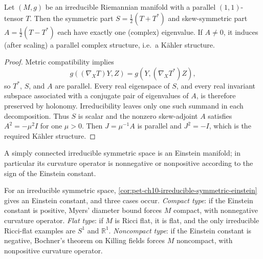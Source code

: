 \begin{theorem}
  \label{thm:pet-ch10-parallel-tensor-eigenvalue}
  Let $(M,g)$ be an irreducible Riemannian manifold with a parallel $(1,1)$-tensor
  $T$. Then the symmetric part $S=\tfrac12(T+T^*)$ and skew-symmetric part
  $A=\tfrac12(T-T^*)$ each have exactly one (complex) eigenvalue. If $A\ne0$, it
  induces (after scaling) a parallel complex structure, i.e.\ a Kähler structure.
\end{theorem}
\begin{proof}
  \sketch
  Metric compatibility implies
  \[
    g((\nabla_XT)Y,Z)=g(Y,(\nabla_XT^*)Z),
  \]
  so $T^*$, $S$, and $A$ are parallel. Every real eigenspace of $S$, and every
  real invariant subspace associated with a conjugate pair of eigenvalues of
  $A$, is therefore preserved by holonomy. Irreducibility leaves only one such
  summand in each decomposition. Thus $S$ is scalar and the nonzero
  skew-adjoint $A$ satisfies $A^2=-\mu^2I$ for one $\mu>0$. Then
  $J=\mu^{-1}A$ is parallel and $J^2=-I$, which is the required Kähler
  structure.
\end{proof}

\begin{corollary}
  \label{cor:pet-ch10-irreducible-symmetric-einstein}
  A simply connected irreducible symmetric space is an Einstein manifold; in
  particular its curvature operator is nonnegative or nonpositive according to
  the sign of the Einstein constant.
\end{corollary}

\begin{remark}
  \label{rem:pet-ch10-compact-flat-noncompact-type}
  For an irreducible symmetric space, \cref{cor:pet-ch10-irreducible-symmetric-einstein}
  gives an Einstein constant, and three cases occur. \emph{Compact type}: if the
  Einstein constant is positive, Myers' diameter bound forces $M$ compact, with
  nonnegative curvature operator. \emph{Flat type}: if $M$ is Ricci flat, it is
  flat, and the only irreducible Ricci-flat examples are $S^1$ and $\mathbb R^1$.
  \emph{Noncompact type}: if the Einstein constant is negative, Bochner's theorem
  on Killing fields forces $M$ noncompact, with nonpositive curvature operator.
\end{remark}

